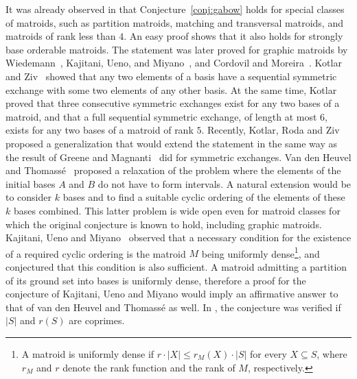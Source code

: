 \documentclass[11pt,a4paper]{article}
\theoremstyle{plain}
\theoremstyle{definition}
\begin{document}
It was already observed in \cite{gabow1976decomposing} that Conjecture~\ref{conj:gabow} holds for special classes of matroids, such as partition matroids, matching and transversal matroids, and matroids of rank less than $4$. An easy proof shows that it also holds for strongly base orderable matroids. The statement was later proved for graphic matroids by Wiedemann~\cite{wiedemann1984cyclic}, Kajitani, Ueno, and Miyano~\cite{kajitani1988ordering}, and Cordovil and Moreira~\cite{cordovil1993bases}. Kotlar and Ziv~\cite{kotlar2013serial} showed that any two elements of a basis have a sequential symmetric exchange with some two elements of any other basis. At the same time, Kotlar~\cite{kotlar2013circuits} proved that three consecutive symmetric exchanges exist for any two bases of a matroid, and that a full sequential symmetric exchange, of length at most $6$, exists for any two bases of a matroid of rank $5$.  Recently, Kotlar, Roda and Ziv~\cite{kotlar2021sequential} proposed a generalization that would extend the statement in the same way as the result of Greene and Magnanti~\cite{greene1975some} did for symmetric exchanges. Van den Heuvel and Thomass\'e~\cite{van2012cyclic} proposed a relaxation of the problem where the elements of the initial bases $A$ and $B$ do not have to form intervals. A natural extension would be to consider $k$ bases and to find a suitable cyclic ordering of the elements of these $k$ bases combined. This latter problem is wide open even for matroid classes for which the original conjecture is known to hold, including graphic matroids. Kajitani, Ueno and Miyano~\cite{kajitani1988ordering} observed that a necessary condition for the existence of a required cyclic ordering is the matroid $M$ being uniformly dense\footnote{A matroid is uniformly dense if $r\cdot |X|\leq r_M(X)\cdot |S|$ for every $X\subseteq S$, where $r_M$ and $r$ denote the rank function and the rank of $M$, respectively.}, and conjectured that this condition is also sufficient. A matroid admitting a partition of its ground set into bases is uniformly dense, therefore a proof for the conjecture of Kajitani, Ueno and Miyano would imply an affirmative answer to that of van den Heuvel and Thomass\'e as well. In \cite{van2012cyclic}, the conjecture was verified if $|S|$ and $r(S)$ are coprimes.
\end{document}
